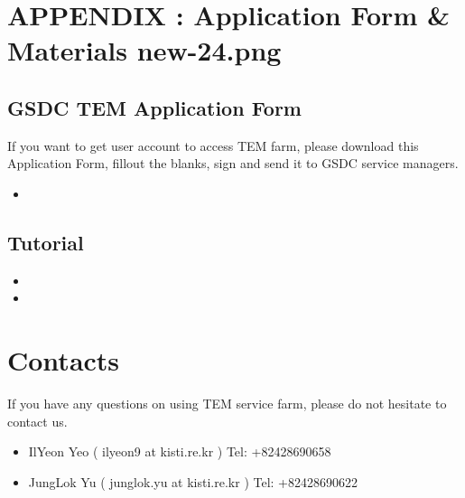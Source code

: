\documentclass[a4paper,11pt,english]{sphinxmanual}
\begin{document}
\sphinxstepscope


\chapter[APPENDIX : Application Form \& Materials]{APPENDIX : Application Form \& Materials \lowercase{\sphinxincludegraphics}{{new-24}.png}}
\label{\detokenize{app:appendix-application-form-materials-newi}}\label{\detokenize{app::doc}}

\section{GSDC TEM Application Form}
\label{\detokenize{app:gsdc-tem-application-form}}
\sphinxAtStartPar
If you want to get user account to access TEM farm, please download this Application Form, fill\sphinxhyphen{}out the blanks, sign and send it to GSDC service managers.
\begin{itemize}
\item {} 
\sphinxAtStartPar
{}

\end{itemize}


\section{Tutorial}
\label{\detokenize{app:tutorial}}\begin{itemize}
\item {} 
\sphinxAtStartPar
{}

\item {} 
\sphinxAtStartPar
{}

\end{itemize}

\sphinxstepscope


\chapter{Contacts}
\label{\detokenize{contact:contacts}}\label{\detokenize{contact::doc}}
\sphinxAtStartPar
If you have any questions on using TEM service farm, please do not hesitate to contact us.
\begin{itemize}
\item {} 
\sphinxAtStartPar
Il\sphinxhyphen{}Yeon Yeo ( ilyeon9 at kisti.re.kr ) Tel: +82\sphinxhyphen{}42\sphinxhyphen{}869\sphinxhyphen{}0658

\item {} 
\sphinxAtStartPar
Jung\sphinxhyphen{}Lok Yu ( junglok.yu at kisti.re.kr ) Tel: +82\sphinxhyphen{}42\sphinxhyphen{}869\sphinxhyphen{}0622

\end{itemize}
\end{document}
